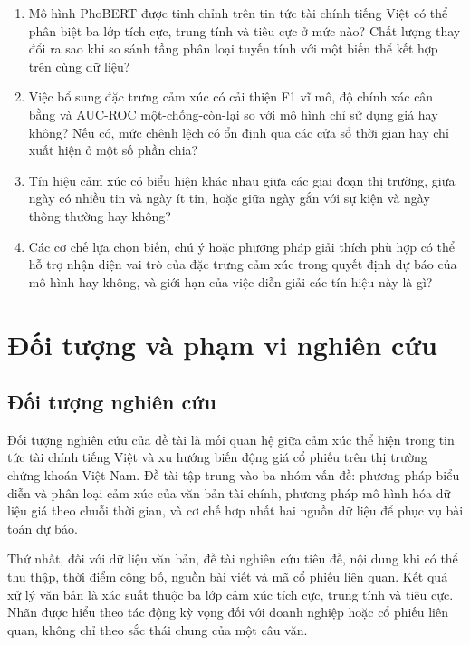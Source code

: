 \begin{enumerate}[nosep]
  \item Mô hình PhoBERT được tinh chỉnh trên tin tức tài chính tiếng Việt có thể phân
    biệt ba lớp tích cực, trung tính và tiêu cực ở mức nào? Chất lượng thay đổi ra sao
    khi so sánh tầng phân loại tuyến tính với một biến thể kết hợp trên cùng dữ liệu?
  \item Việc bổ sung đặc trưng cảm xúc có cải thiện F1 vĩ mô, độ chính xác cân bằng và
    AUC-ROC một-chống-còn-lại so với mô hình chỉ sử dụng giá hay không? Nếu có, mức chênh lệch có
    ổn định qua các cửa sổ thời gian hay chỉ xuất hiện ở một số phần chia?
  \item Tín hiệu cảm xúc có biểu hiện khác nhau giữa các giai đoạn thị trường, giữa ngày
    có nhiều tin và ngày ít tin, hoặc giữa ngày gắn với sự kiện và ngày thông thường hay
    không?
  \item Các cơ chế lựa chọn biến, chú ý hoặc phương pháp giải thích phù hợp có thể
    hỗ trợ nhận diện vai trò của đặc trưng cảm xúc trong quyết định dự báo của mô hình
    hay không, và giới hạn của việc diễn giải các tín hiệu này là gì?
\end{enumerate}

\section{Đối tượng và phạm vi nghiên cứu}
\label{sec:pham-vi}

\subsection{Đối tượng nghiên cứu}

Đối tượng nghiên cứu của đề tài là mối quan hệ giữa cảm xúc thể hiện trong tin tức tài
chính tiếng Việt và xu hướng biến động giá cổ phiếu trên thị trường chứng khoán Việt
Nam. Đề tài tập trung vào ba nhóm vấn đề: phương pháp biểu diễn và phân loại cảm xúc
của văn bản tài chính, phương pháp mô hình hóa dữ liệu giá theo chuỗi thời gian, và cơ
chế hợp nhất hai nguồn dữ liệu để phục vụ bài toán dự báo.

Thứ nhất, đối với dữ liệu văn bản, đề tài nghiên cứu tiêu đề, nội dung khi có thể thu
thập, thời điểm công bố, nguồn bài viết và mã cổ phiếu liên quan. Kết quả xử lý văn bản
là xác suất thuộc ba lớp cảm xúc tích cực, trung tính và tiêu cực. Nhãn được hiểu theo
tác động kỳ vọng đối với doanh nghiệp hoặc cổ phiếu liên quan, không chỉ theo sắc thái
chung của một câu văn.

